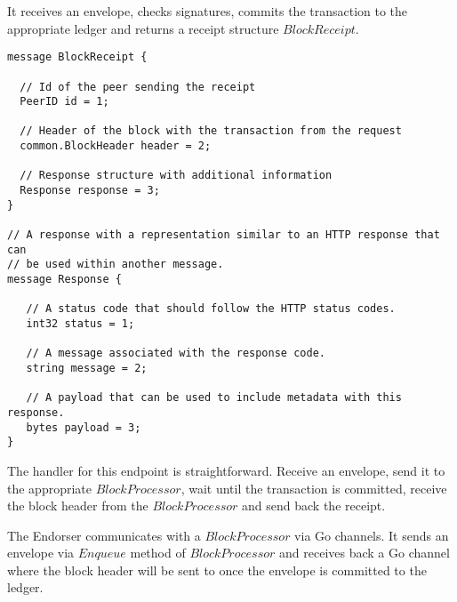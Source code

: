 It receives an envelope, checks signatures, commits the transaction to the appropriate ledger and returns a receipt structure $BlockReceipt$.

\begin{lstlisting}
message BlockReceipt {

  // Id of the peer sending the receipt
  PeerID id = 1;

  // Header of the block with the transaction from the request
  common.BlockHeader header = 2;

  // Response structure with additional information
  Response response = 3;
}

// A response with a representation similar to an HTTP response that can
// be used within another message.
message Response {

   // A status code that should follow the HTTP status codes.
   int32 status = 1;

   // A message associated with the response code.
   string message = 2;

   // A payload that can be used to include metadata with this response.
   bytes payload = 3;
}
\end{lstlisting}

The handler for this endpoint is straightforward. Receive an envelope, send it to the appropriate $BlockProcessor$, wait until the transaction is committed, receive the block header from the $BlockProcessor$ and send back the receipt.

The Endorser communicates with a $BlockProcessor$ via Go channels.
It sends an envelope via $Enqueue$ method of $BlockProcessor$ and receives back a Go channel where the block header will be sent to once the envelope is committed to the ledger. 
